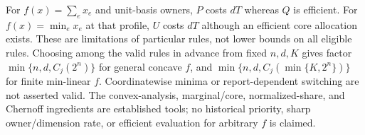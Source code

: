 \begin{remark}\label{ext:rem:limits}
For $f(x)=\sum_ex_e$ and unit-basis owners, $P$ costs $dT$ whereas $Q$ is
efficient.  For $f(x)=\min_ex_e$ at that profile, $U$ costs $dT$ although
an efficient core allocation exists.  These are limitations of particular
rules, not lower bounds on all eligible rules.
Choosing among the valid rules in advance from fixed $n,d,K$ gives factor
$\min\{n,d,C_j(2^n)\}$ for general concave $f$, and
$\min\{n,d,C_j(\min\{K,2^n\})\}$ for finite min-linear $f$.
Coordinatewise minima or report-dependent switching are not asserted valid.
The convex-analysis, marginal/core, normalized-share, and Chernoff ingredients
are established tools; no historical priority, sharp owner/dimension rate,
or efficient evaluation for arbitrary $f$ is claimed.
\end{remark}
